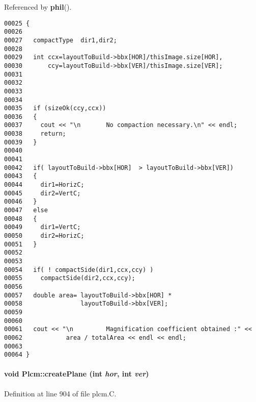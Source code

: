 Referenced by {\bf phil}().\small\begin{verbatim}00025 {
00026 
00027   compactType  dir1,dir2;
00028 
00029   int ccx=layoutToBuild->bbx[HOR]/thisImage.size[HOR],
00030       ccy=layoutToBuild->bbx[VER]/thisImage.size[VER];
00031   
00032 
00033 
00034 
00035   if (sizeOk(ccy,ccx))
00036   {
00037     cout << "\n       No compaction necessary.\n" << endl; 
00038     return;
00039   }
00040 
00041 
00042   if( layoutToBuild->bbx[HOR]  > layoutToBuild->bbx[VER])
00043   {
00044     dir1=HorizC;
00045     dir2=VertC;
00046   }
00047   else
00048   {
00049     dir1=VertC;
00050     dir2=HorizC;
00051   }  
00052   
00053 
00054   if( ! compactSide(dir1,ccx,ccy) )
00055     compactSide(dir2,ccx,ccy);
00056 
00057   double area= layoutToBuild->bbx[HOR] *
00058                layoutToBuild->bbx[VER];     
00059 
00060 
00061   cout << "\n         Magnification coefficient obtained :" << 
00062            area / totalArea << endl << endl;
00063 
00064 }
\end{verbatim}\normalsize 
\label{Plcm_a4}
\paragraph{\setlength{\rightskip}{0pt plus 5cm}void Plcm::create\-Plane (int {\em hor}, int {\em ver})}\hfill



Definition at line 904 of file plcm.C.

